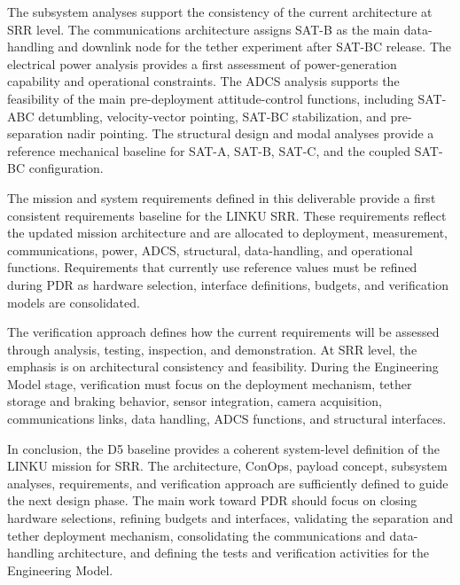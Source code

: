 The subsystem analyses support the consistency of the current architecture at SRR level. The communications architecture assigns SAT-B as the main data-handling and downlink node for the tether experiment after SAT-BC release. The electrical power analysis provides a first assessment of power-generation capability and operational constraints. The ADCS analysis supports the feasibility of the main pre-deployment attitude-control functions, including SAT-ABC detumbling, velocity-vector pointing, SAT-BC stabilization, and pre-separation nadir pointing. The structural design and modal analyses provide a reference mechanical baseline for SAT-A, SAT-B, SAT-C, and the coupled SAT-BC configuration.

The mission and system requirements defined in this deliverable provide a first consistent requirements baseline for the LINKU SRR. These requirements reflect the updated mission architecture and are allocated to deployment, measurement, communications, power, ADCS, structural, data-handling, and operational functions. Requirements that currently use reference values must be refined during PDR as hardware selection, interface definitions, budgets, and verification models are consolidated.

The verification approach defines how the current requirements will be assessed through analysis, testing, inspection, and demonstration. At SRR level, the emphasis is on architectural consistency and feasibility. During the Engineering Model stage, verification must focus on the deployment mechanism, tether storage and braking behavior, sensor integration, camera acquisition, communications links, data handling, ADCS functions, and structural interfaces.

In conclusion, the D5 baseline provides a coherent system-level definition of the LINKU mission for SRR. The architecture, ConOps, payload concept, subsystem analyses, requirements, and verification approach are sufficiently defined to guide the next design phase. The main work toward PDR should focus on closing hardware selections, refining budgets and interfaces, validating the separation and tether deployment mechanism, consolidating the communications and data-handling architecture, and defining the tests and verification activities for the Engineering Model.











